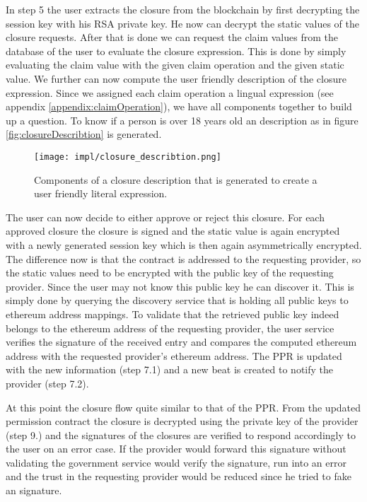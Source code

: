 In step 5 the user extracts the closure from the blockchain by first decrypting the session key with his RSA private key. He now can decrypt the static values of the closure requests. After that is done we can request the claim values from the database of the user to evaluate the closure expression. This is done by simply evaluating the claim value with the given claim operation and the given static value. We further can now compute the user friendly description of the closure expression. Since we assigned each claim operation a lingual expression (see appendix \ref{appendix:claimOperation}), we have all components together to build up a question. To know if a person is over 18 years old an description as in figure \ref{fig:closureDescribtion} is generated.

\begin{figure}
\texttt{[image: impl/closure\_describtion.png]}
\centering
\caption{Components of a closure description that is generated to create a user friendly literal expression.}
\label{fig:closureDescription}
\end{figure}

The user can now decide to either approve or reject this closure. For each approved closure the closure is signed and the static value is again encrypted with a newly generated session key which is then again asymmetrically encrypted. The difference now is that the contract is addressed to the requesting provider, so the static values need to be encrypted with the public key of the requesting provider. Since the user may not know this public key he can discover it. This is simply done by querying the discovery service that is holding all public keys to ethereum address mappings. To validate that the retrieved public key indeed belongs to the ethereum address of the requesting provider, the user service verifies the signature of the received entry and compares the computed ethereum address with the requested provider’s ethereum address. The PPR is updated with the new information (step 7.1) and a new beat is created to notify the provider (step 7.2). 

At this point the closure flow quite similar to that of the PPR. From the updated permission contract  the closure is decrypted using the private key of the provider (step 9.) and the signatures of the closures are verified to respond accordingly to the user on an error case. If the provider would forward this signature without validating the government service would verify the signature, run into an error and the trust in the requesting provider would be reduced since he tried to fake an signature. 

